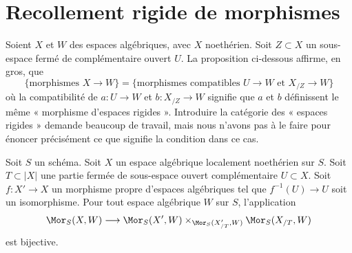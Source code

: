 \section{Recollement rigide de morphismes}
\label{section-glue-formal-to-actual}

\noindent
Soient $X$ et $W$ des espaces algébriques, avec $X$ noethérien. Soit
$Z \subset X$ un sous-espace fermé de complémentaire ouvert $U$.
La proposition ci-dessous affirme, en gros, que
$$
\{\text{morphismes }X \to W\} =
\{\text{morphismes compatibles }U \to W\text{ et }X_{/Z} \to W\}
$$
où la compatibilité de $a : U \to W$ et $b : X_{/Z} \to W$
signifie que $a$ et $b$ définissent le même « morphisme d'espaces rigides ».
Introduire la catégorie des « espaces rigides » demande beaucoup de travail,
mais nous n'avons pas à le faire pour énoncer précisément ce que signifie
la condition dans ce cas.

\begin{proposition}
\label{proposition-glue-modification}
Soit $S$ un schéma. Soit $X$ un espace algébrique localement noethérien sur
$S$. Soit $T \subset |X|$ une partie fermée de sous-espace ouvert
complémentaire $U \subset X$. Soit $f : X' \to X$ un morphisme propre
d'espaces algébriques tel que $f^{-1}(U) \to U$ soit un isomorphisme.
Pour tout espace algébrique $W$ sur $S$, l'application
$$
\Mor_S(X, W) \longrightarrow
\Mor_S(X', W) \times_{\Mor_S(X'_{/T}, W)} \Mor_S(X_{/T}, W)
$$
est bijective.
\end{proposition}

